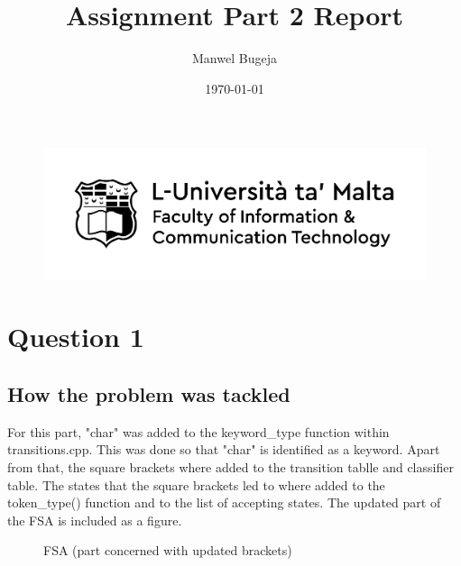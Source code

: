 \documentclass[a4paper, 12pt]{article}
\begin{document}
\begin{figure}
    \centering
    \includegraphics[width=1\textwidth]{Logo}
\end{figure}

\title{Assignment Part 2 Report}
\author{Manwel Bugeja}
\date{\today}
\maketitle

\tableofcontents
\newpage

\section{Question 1}
\subsection{How the problem was tackled} 
For this part, "char" was added to the keyword\_type function within transitions.cpp. This was done so that "char" is identified as a keyword.
Apart from that, the square brackets where added to the transition tablle and classifier table. The states that the square brackets led to where added 
to the token\_type() function and to the list of accepting states. The updated part of the FSA is included as a figure.

\begin{figure}[h]
    \centering
    \caption{FSA (part concerned with updated brackets)}
\end{figure}
\end{document}
